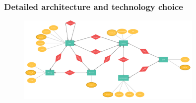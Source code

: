 \documentclass[aspectratio=169]{beamer}
\begin{document}
\begin{frame}
	\frametitle{Detailed architecture and technology choice}
	 \begin{figure}
		\centering
		\includegraphics[width=0.8\textwidth]{media/entity-relationship-diagram.pdf}
	\end{figure}
\end{frame}
\end{document}
